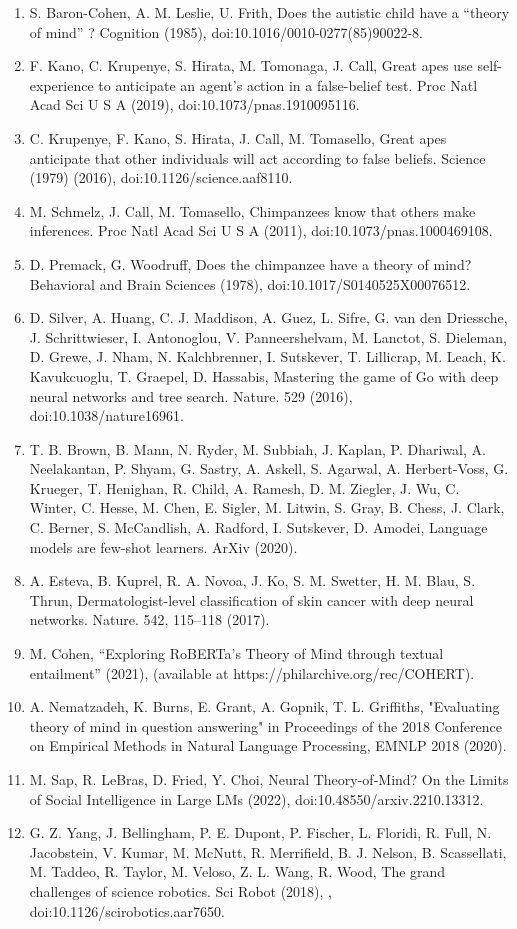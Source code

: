 \documentclass[11pt]{article}
\begin{document}
\begin{enumerate}
\item S. Baron-Cohen, A. M. Leslie, U. Frith, Does the autistic child have a “theory of mind” ? Cognition (1985), doi:10.1016/0010-0277(85)90022-8.
\item F. Kano, C. Krupenye, S. Hirata, M. Tomonaga, J. Call, Great apes use self-experience to anticipate an agent’s action in a false-belief test. Proc Natl Acad Sci U S A (2019), doi:10.1073/pnas.1910095116.
\item C. Krupenye, F. Kano, S. Hirata, J. Call, M. Tomasello, Great apes anticipate that other individuals will act according to false beliefs. Science (1979) (2016), doi:10.1126/science.aaf8110.
\item M. Schmelz, J. Call, M. Tomasello, Chimpanzees know that others make inferences. Proc Natl Acad Sci U S A (2011), doi:10.1073/pnas.1000469108.
\item D. Premack, G. Woodruff, Does the chimpanzee have a theory of mind? Behavioral and Brain Sciences (1978), doi:10.1017/S0140525X00076512.
\item D. Silver, A. Huang, C. J. Maddison, A. Guez, L. Sifre, G. van den Driessche, J. Schrittwieser, I. Antonoglou, V. Panneershelvam, M. Lanctot, S. Dieleman, D. Grewe, J. Nham, N. Kalchbrenner, I. Sutskever, T. Lillicrap, M. Leach, K. Kavukcuoglu, T. Graepel, D. Hassabis, Mastering the game of Go with deep neural networks and tree search. Nature. 529 (2016), doi:10.1038/nature16961.
\item T. B. Brown, B. Mann, N. Ryder, M. Subbiah, J. Kaplan, P. Dhariwal, A. Neelakantan, P. Shyam, G. Sastry, A. Askell, S. Agarwal, A. Herbert-Voss, G. Krueger, T. Henighan, R. Child, A. Ramesh, D. M. Ziegler, J. Wu, C. Winter, C. Hesse, M. Chen, E. Sigler, M. Litwin, S. Gray, B. Chess, J. Clark, C. Berner, S. McCandlish, A. Radford, I. Sutskever, D. Amodei, Language models are few-shot learners. ArXiv (2020).
\item A. Esteva, B. Kuprel, R. A. Novoa, J. Ko, S. M. Swetter, H. M. Blau, S. Thrun, Dermatologist-level classification of skin cancer with deep neural networks. Nature. 542, 115–118 (2017).
\item M. Cohen, “Exploring RoBERTa’s Theory of Mind through textual entailment” (2021), (available at https://philarchive.org/rec/COHERT).
\item A. Nematzadeh, K. Burns, E. Grant, A. Gopnik, T. L. Griffiths, "Evaluating theory of mind in question answering" in Proceedings of the 2018 Conference on Empirical Methods in Natural Language Processing, EMNLP 2018 (2020).
\item M. Sap, R. LeBras, D. Fried, Y. Choi, Neural Theory-of-Mind? On the Limits of Social Intelligence in Large LMs (2022), doi:10.48550/arxiv.2210.13312.
\item G. Z. Yang, J. Bellingham, P. E. Dupont, P. Fischer, L. Floridi, R. Full, N. Jacobstein, V. Kumar, M. McNutt, R. Merrifield, B. J. Nelson, B. Scassellati, M. Taddeo, R. Taylor, M. Veloso, Z. L. Wang, R. Wood, The grand challenges of science robotics. Sci Robot (2018), , doi:10.1126/scirobotics.aar7650.


\end{enumerate}
\end{document}
